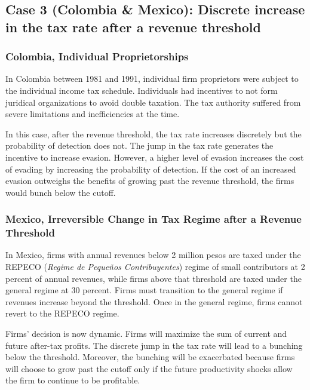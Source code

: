 \documentclass[
  12pt]{article}
\begin{document}
\hypertarget{case-3-colombia-mexico-discrete-increase-in-the-tax-rate-after-a-revenue-threshold}{%
\subsection{Case 3 (Colombia \& Mexico): Discrete increase in the tax
rate after a revenue
threshold}\label{case-3-colombia-mexico-discrete-increase-in-the-tax-rate-after-a-revenue-threshold}}

\hypertarget{colombia-individual-proprietorships}{%
\subsubsection{Colombia, Individual
Proprietorships}\label{colombia-individual-proprietorships}}

In Colombia between 1981 and 1991, individual firm proprietors were
subject to the individual income tax schedule. Individuals had
incentives to not form juridical organizations to avoid double taxation.
The tax authority suffered from severe limitations and inefficiencies at
the time.

In this case, after the revenue threshold, the tax rate increases
discretely but the probability of detection does not. The jump in the
tax rate generates the incentive to increase evasion. However, a higher
level of evasion increases the cost of evading by increasing the
probability of detection. If the cost of an increased evasion outweighs
the benefits of growing past the revenue threshold, the firms would
bunch below the cutoff.

\hypertarget{mexico-irreversible-change-in-tax-regime-after-a-revenue-threshold}{%
\subsubsection{Mexico, Irreversible Change in Tax Regime after a Revenue
Threshold}\label{mexico-irreversible-change-in-tax-regime-after-a-revenue-threshold}}

In Mexico, firms with annual revenues below 2 million pesos are taxed
under the REPECO (\emph{Regime de Pequeños Contribuyentes}) regime of
small contributors at 2 percent of annual revenues, while firms above
that threshold are taxed under the general regime at 30 percent. Firms
must transition to the general regime if revenues increase beyond the
threshold. Once in the general regime, firms cannot revert to the REPECO
regime.

Firms' decision is now dynamic. Firms will maximize the sum of current
and future after-tax profits. The discrete jump in the tax rate will
lead to a bunching below the threshold. Moreover, the bunching will be
exacerbated because firms will choose to grow past the cutoff only if
the future productivity shocks allow the firm to continue to be
profitable.
\end{document}
